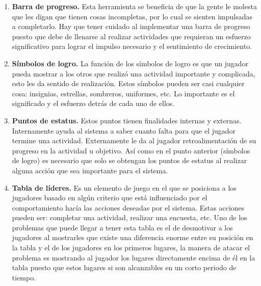     \begin{enumerate}
        
        \item \textbf{Barra de progreso.} Esta herramienta se beneficia de que la gente le molesta que les digan que tienen cosas incompletas, por lo cual se sienten impulsadas a completarlo. Hay que tener cuidado al implementar una barra de progreso puesto que debe de llenarse al realizar actividades que requieran un esfuerzo significativo para lograr el impulso necesario y el sentimiento de crecimiento.\cite[p. 113]{libro2}
        
        \item \textbf{Símbolos de logro.} La función de los símbolos de logro es que un jugador pueda mostrar a los otros que realizó una actividad importante y complicada, esto les da sentido de realización. Estos símbolos pueden ser casi cualquier cosa: insignias, estrellas, sombreros, uniformes, etc. Lo importante es el significado y el esfuerzo detrás de cada uno de ellos.\cite[p. 117]{libro2}
        
        \item \textbf{Puntos de estatus.} Estos puntos tienen finalidades internas y externas. Internamente ayuda al sistema a saber cuanto falta para que el jugador termine una actividad. Externamente le da al jugador retroalimentación de su progreso en la actividad u objetivo. Así como en el punto anterior (símbolos de logro) es necesario que solo se obtengan los puntos de estatus al realizar alguna acción que sea importante para el sistema.\cite[p. 118]{libro2}
        
        \item \textbf{Tabla de líderes.} Es un elemento de juego en el que se posiciona a los jugadores basado en algún criterio que está influenciado por el comportamiento hacía las acciones deseadas por el sistema. Estas acciones pueden ser: completar una actividad, realizar una encuesta, etc. Uno de los problemas que puede llegar a tener esta tabla es el de desmotivar a los jugadores al mostrarles que existe una diferencia enorme entre su posición en la tabla y el de los jugadores en los primeros lugares, la manera de atacar el problema es mostrando al jugador los lugares directamente encima de él en la tabla puesto que estos lugares si son alcanzables en un corto periodo de tiempo.\cite[p. 121]{libro2}
        
    \end{enumerate}
    
    \subsubsection{\principioIII}
    \label{subsec:prinpcioIII}
    
